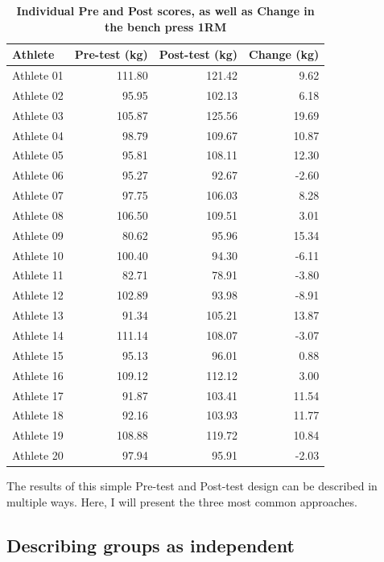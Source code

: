 \documentclass[
]{book}
\begin{document}
\begin{table}

\caption{\label{tab:bench-press-1RM-pre-post}\textbf{Individual Pre and Post scores, as well as Change in the bench press 1RM}}
\centering
\begin{tabular}[t]{lrrr}
\toprule
Athlete & Pre-test (kg) & Post-test (kg) & Change (kg)\\
\midrule
Athlete 01 & 111.80 & 121.42 & 9.62\\
Athlete 02 & 95.95 & 102.13 & 6.18\\
Athlete 03 & 105.87 & 125.56 & 19.69\\
Athlete 04 & 98.79 & 109.67 & 10.87\\
Athlete 05 & 95.81 & 108.11 & 12.30\\
\addlinespace
Athlete 06 & 95.27 & 92.67 & -2.60\\
Athlete 07 & 97.75 & 106.03 & 8.28\\
Athlete 08 & 106.50 & 109.51 & 3.01\\
Athlete 09 & 80.62 & 95.96 & 15.34\\
Athlete 10 & 100.40 & 94.30 & -6.11\\
\addlinespace
Athlete 11 & 82.71 & 78.91 & -3.80\\
Athlete 12 & 102.89 & 93.98 & -8.91\\
Athlete 13 & 91.34 & 105.21 & 13.87\\
Athlete 14 & 111.14 & 108.07 & -3.07\\
Athlete 15 & 95.13 & 96.01 & 0.88\\
\addlinespace
Athlete 16 & 109.12 & 112.12 & 3.00\\
Athlete 17 & 91.87 & 103.41 & 11.54\\
Athlete 18 & 92.16 & 103.93 & 11.77\\
Athlete 19 & 108.88 & 119.72 & 10.84\\
Athlete 20 & 97.94 & 95.91 & -2.03\\
\bottomrule
\end{tabular}
\end{table}

The results of this simple Pre-test and Post-test design can be described in multiple ways. Here, I will present the three most common approaches.

\hypertarget{describing-groups-as-independent}{%
\subsection{Describing groups as independent}\label{describing-groups-as-independent}}
\end{document}
